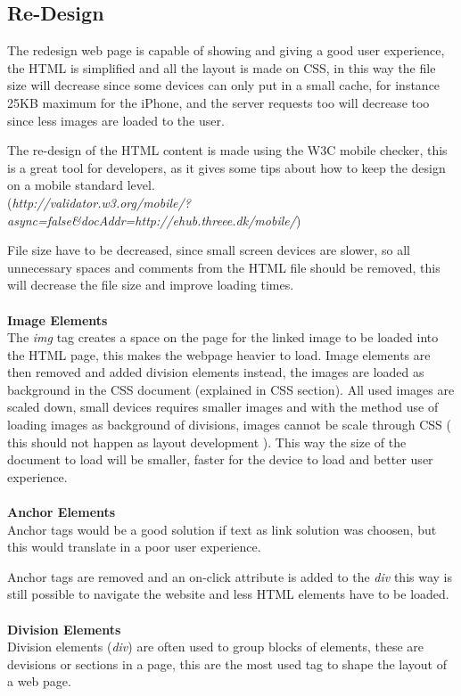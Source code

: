 \subsection{Re-Design}

The redesign web page is capable of showing and giving a good user experience, the HTML is simplified and all the layout is made on CSS, in this way the file size will decrease  since some devices can only put in a small cache, for instance 25KB maximum for the iPhone, and the server requests too will decrease too since less images are loaded to the user.

The re-design of the HTML content is made using the W3C mobile checker, this is a great tool for developers, as it gives some tips about how to keep the design on a mobile standard level. \\(\textit{http://validator.w3.org/mobile/?async=false\&docAddr=http://ehub.threee.dk/mobile/})

File size have to be decreased, since small screen devices are slower, so all unnecessary spaces and comments from the HTML file should be removed, this will decrease the file size and improve loading times.
\\\\
\textbf{Image Elements}\\
The \textit{img} tag creates a space on the page for the linked image to be loaded into the HTML page, this makes the webpage heavier to load.
Image elements are then removed and added division elements instead, the images are loaded as background in the CSS document (explained in CSS section).
All used images are scaled down, small devices requires smaller images and with the method use of loading images as background of divisions, images cannot be scale through CSS ( this should not happen as layout development ). This way the size of the document to load will be smaller, faster for the device to load and better user experience.
\\\\
\textbf{Anchor Elements}\\
Anchor tags would be a good solution if text as link solution was choosen, but this would translate in a poor user experience. 

Anchor tags are removed and an on-click attribute is added to the \textit{div} this way is still possible to navigate the website and less HTML elements have to be loaded. 
\\\\
\textbf{Division Elements}\\
Division elements (\textit{div}) are often used to group blocks of elements, these are devisions or sections in a page, this are the most used tag to shape the layout of a web page.

